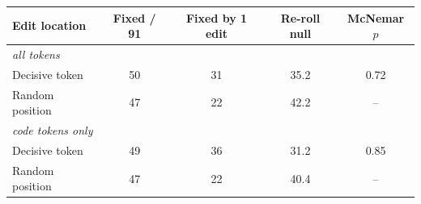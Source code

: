 \begin{tabular}{lcccc}
\toprule
Edit location & Fixed / 91 & Fixed by 1 edit & Re-roll null & McNemar $p$ \\
\midrule
\multicolumn{5}{l}{\emph{all tokens}} \\
\quad Decisive token & 50 & 31 & 35.2 & 0.72 \\
\quad Random position & 47 & 22 & 42.2 & -- \\
\multicolumn{5}{l}{\emph{code tokens only}} \\
\quad Decisive token & 49 & 36 & 31.2 & 0.85 \\
\quad Random position & 47 & 22 & 40.4 & -- \\
\bottomrule
\end{tabular}
